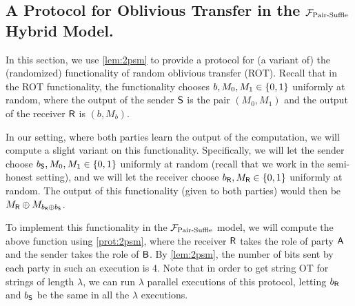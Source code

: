 
\subsection{A Protocol for Oblivious Transfer 
in the ${\cal F}_{\operatorname{Pair-Suffle}}$ Hybrid Model.}\label{sec:OTprot}
In this section, we use \cref{lem:2psm} to provide a protocol for (a variant of) the (randomized) functionality of random oblivious transfer (ROT). 
Recall that in the ROT functionality, the functionality chooses $b,M_0,M_1\in \{0,1\}$ uniformly at random, where the output of the sender $\mathsf{S}$ is the pair $(M_0,M_1)$ and the output of the receiver $\mathsf{R}$ is $(b,M_b)$.


In our setting, where both parties learn the output of the computation, we will compute a slight variant on this functionality. 
Specifically, we will let the sender choose $b_{\mathsf{S}},M_0,M_1\in \{0,1\}$ uniformly at random (recall that we work in the semi-honest setting), and we will let the receiver choose $b_{\mathsf{R}},M_{\mathsf{R}}\in \{0,1\}$ uniformly at random.
The output of this functionality (given to both parties) would then be $M_{\mathsf{R}}\oplus M_{b_{\mathsf{R}}\oplus b_{\mathsf{S}}}$. 


To implement this functionality in the 
${\cal F}_{\operatorname{Pair-Suffle}}$
model, we will compute the above function using \cref{prot:2psm}, where the receiver $\mathsf{R}$ takes the role of party $\mathsf{A}$ and the sender takes the role of $\mathsf{B}$. By \cref{lem:2psm}, the number of bits sent by each party in such an execution is 4. Note that in order to get string OT for strings of length $\lambda$, we can run $\lambda$ parallel executions of this protocol, letting $b_{\mathsf{R}}$ and $b_{\mathsf{S}}$ be the same in all the $\lambda$ executions.

